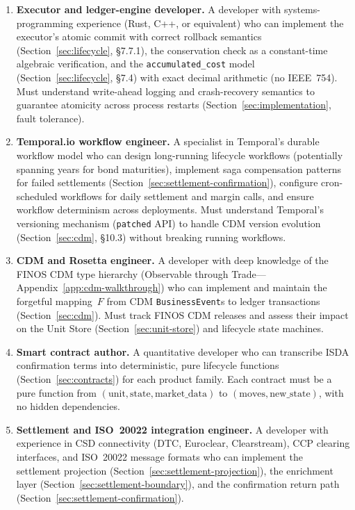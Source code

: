 \documentclass[11pt,a4paper]{article}
\begin{document}
\begin{enumerate}

\item \textbf{Executor and ledger-engine developer.}
A developer with systems-programming experience (Rust, C++, or equivalent) who can implement the executor's atomic commit with correct rollback semantics (Section~\ref{sec:lifecycle}, \S7.7.1), the conservation check as a constant-time algebraic verification, and the \texttt{accumulated\_cost} model (Section~\ref{sec:lifecycle}, \S7.4) with exact decimal arithmetic (no IEEE~754). Must understand write-ahead logging and crash-recovery semantics to guarantee atomicity across process restarts (Section~\ref{sec:implementation}, fault tolerance).

\item \textbf{Temporal.io workflow engineer.}
A specialist in Temporal's durable workflow model who can design long-running lifecycle workflows (potentially spanning years for bond maturities), implement saga compensation patterns for failed settlements (Section~\ref{sec:settlement-confirmation}), configure cron-scheduled workflows for daily settlement and margin calls, and ensure workflow determinism across deployments. Must understand Temporal's versioning mechanism (\texttt{patched} API) to handle CDM version evolution (Section~\ref{sec:cdm}, \S10.3) without breaking running workflows.

\item \textbf{CDM and Rosetta engineer.}
A developer with deep knowledge of the FINOS CDM type hierarchy (Observable through Trade---Appendix~\ref{app:cdm-walkthrough}) who can implement and maintain the forgetful mapping~$F$ from CDM \texttt{BusinessEvent}s to ledger transactions (Section~\ref{sec:cdm}). Must track FINOS CDM releases and assess their impact on the Unit Store (Section~\ref{sec:unit-store}) and lifecycle state machines.

\item \textbf{Smart contract author.}
A quantitative developer who can transcribe ISDA confirmation terms into deterministic, pure lifecycle functions (Section~\ref{sec:contracts}) for each product family. Each contract must be a pure function from $(\text{unit}, \text{state}, \text{market\_data})$ to $(\text{moves}, \text{new\_state})$, with no hidden dependencies.

\item \textbf{Settlement and ISO~20022 integration engineer.}
A developer with experience in CSD connectivity (DTC, Euroclear, Clearstream), CCP clearing interfaces, and ISO~20022 message formats who can implement the settlement projection (Section~\ref{sec:settlement-projection}), the enrichment layer (Section~\ref{sec:settlement-boundary}), and the confirmation return path (Section~\ref{sec:settlement-confirmation}).


\end{enumerate}
\end{document}
